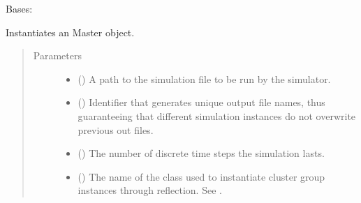 \documentclass[letterpaper,10pt,english]{sphinxmanual}
\begin{document}
\begin{fulllineitems}
\label{\detokenize{app.domain:app.domain.master_servers.NewscastMaster}}
Bases: {\hyperref[\detokenize{app.domain:app.domain.master_servers.Master}]{}}

\begin{fulllineitems}
\label{\detokenize{app.domain:app.domain.master_servers.NewscastMaster.__init__}}
Instantiates an Master object.
\begin{quote}\begin{description}
\item[{Parameters}] \leavevmode\begin{itemize}
\item {} 
 () \textendash{} A path to the simulation file to be run by the simulator.

\item {} 
 () \textendash{} Identifier that generates unique output file names,
thus guaranteeing that different simulation instances do not
overwrite previous out files.

\item {} 
 () \textendash{} The number of discrete time steps the simulation lasts.

\item {} 
 () \textendash{} The name of the class used to instantiate cluster group
instances through reflection. See {\hyperref[\detokenize{app.domain:module-app.domain.cluster_groups}]{}}.


\end{itemize}
\end{description}
\end{quote}
\end{fulllineitems}
\end{fulllineitems}
\end{document}
